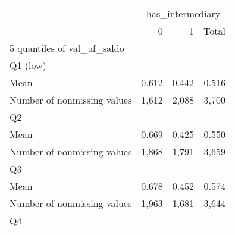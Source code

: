 \documentclass{article}
\begin{document}
\begin{table}[!h]
\centering
\begin{tabular}{llll}
\cline{1-4}
\multicolumn{1}{c}{} &
  \multicolumn{3}{|c}{has\_intermediary} \\
\multicolumn{1}{c}{} &
  \multicolumn{1}{|r}{0} &
  \multicolumn{1}{r}{1} &
  \multicolumn{1}{r}{Total} \\
\cline{1-4}
\multicolumn{1}{l}{5 quantiles of val\_uf\_saldo} &
  \multicolumn{1}{|r}{} &
  \multicolumn{1}{r}{} &
  \multicolumn{1}{r}{} \\
\multicolumn{1}{l}{\hspace{1em}Q1 (low)} &
  \multicolumn{1}{|r}{} &
  \multicolumn{1}{r}{} &
  \multicolumn{1}{r}{} \\
\multicolumn{1}{l}{\hspace{2em}Mean} &
  \multicolumn{1}{|r}{0.612} &
  \multicolumn{1}{r}{0.442} &
  \multicolumn{1}{r}{0.516} \\
\multicolumn{1}{l}{\hspace{2em}Number of nonmissing values} &
  \multicolumn{1}{|r}{1,612} &
  \multicolumn{1}{r}{2,088} &
  \multicolumn{1}{r}{3,700} \\
\multicolumn{1}{l}{\hspace{1em}Q2} &
  \multicolumn{1}{|r}{} &
  \multicolumn{1}{r}{} &
  \multicolumn{1}{r}{} \\
\multicolumn{1}{l}{\hspace{2em}Mean} &
  \multicolumn{1}{|r}{0.669} &
  \multicolumn{1}{r}{0.425} &
  \multicolumn{1}{r}{0.550} \\
\multicolumn{1}{l}{\hspace{2em}Number of nonmissing values} &
  \multicolumn{1}{|r}{1,868} &
  \multicolumn{1}{r}{1,791} &
  \multicolumn{1}{r}{3,659} \\
\multicolumn{1}{l}{\hspace{1em}Q3} &
  \multicolumn{1}{|r}{} &
  \multicolumn{1}{r}{} &
  \multicolumn{1}{r}{} \\
\multicolumn{1}{l}{\hspace{2em}Mean} &
  \multicolumn{1}{|r}{0.678} &
  \multicolumn{1}{r}{0.452} &
  \multicolumn{1}{r}{0.574} \\
\multicolumn{1}{l}{\hspace{2em}Number of nonmissing values} &
  \multicolumn{1}{|r}{1,963} &
  \multicolumn{1}{r}{1,681} &
  \multicolumn{1}{r}{3,644} \\
\multicolumn{1}{l}{\hspace{1em}Q4} &
  \multicolumn{1}{|r}{} &

\end{tabular}
\end{table}
\end{document}
